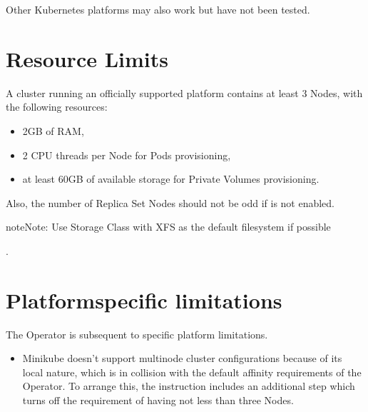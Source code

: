 \documentclass[letterpaper,10pt,english]{sphinxmanual}
\begin{document}
Other Kubernetes platforms may also work but have not been tested.


\section{Resource Limits}
\label{\detokenize{System-Requirements:resource-limits}}
A cluster running an officially supported platform contains at least 3
Nodes, with the following resources:
\begin{itemize}
\item {} 
2GB of RAM,

\item {} 
2 CPU threads per Node for Pods provisioning,

\item {} 
at least 60GB of available storage for Private Volumes provisioning.

\end{itemize}

Also, the number of Replica Set Nodes should not be odd
if {\hyperref[\detokenize{arbiter:arbiter}]{}} is not enabled.

\begin{sphinxadmonition}{note}{Note:}
Use Storage Class with XFS as the default filesystem if possible
\end{sphinxadmonition}

.


\section{Platform\sphinxhyphen{}specific limitations}
\label{\detokenize{System-Requirements:platform-specific-limitations}}
The Operator is subsequent to specific platform limitations.
\begin{itemize}
\item {} 
Minikube doesn’t support multi\sphinxhyphen{}node cluster configurations because of its
local nature, which is in collision with the default affinity requirements
of the Operator. To arrange this, the {\hyperref[\detokenize{minikube:install-minikube}]{}} instruction
includes an additional step which turns off the requirement of having not
less than three Nodes.

\end{itemize}
\end{document}
